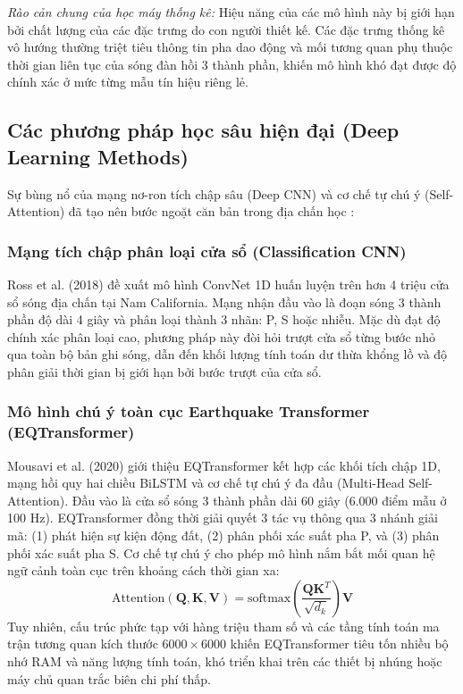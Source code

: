 \documentclass[preprint,1p]{elsarticle}
\begin{document}
\textit{Rào cản chung của học máy thống kê:} Hiệu năng của các mô hình này bị giới hạn bởi chất lượng của các đặc trưng do con người thiết kế. Các đặc trưng thống kê vô hướng thường triệt tiêu thông tin pha dao động và mối tương quan phụ thuộc thời gian liên tục của sóng đàn hồi 3 thành phần, khiến mô hình khó đạt được độ chính xác ở mức từng mẫu tín hiệu riêng lẻ.

\subsection{Các phương pháp học sâu hiện đại (Deep Learning Methods)}
\label{sec:related_dl}

Sự bùng nổ của mạng nơ-ron tích chập sâu (Deep CNN) và cơ chế tự chú ý (Self-Attention) đã tạo nên bước ngoặt căn bản trong địa chấn học \cite{xie2023deep}:

\subsubsection{Mạng tích chập phân loại cửa sổ (Classification CNN)}
Ross et al. (2018) \cite{ross2018generalized} đề xuất mô hình ConvNet 1D huấn luyện trên hơn 4 triệu cửa sổ sóng địa chấn tại Nam California. Mạng nhận đầu vào là đoạn sóng 3 thành phần độ dài 4 giây và phân loại thành 3 nhãn: P, S hoặc nhiễu. Mặc dù đạt độ chính xác phân loại cao, phương pháp này đòi hỏi trượt cửa sổ từng bước nhỏ qua toàn bộ bản ghi sóng, dẫn đến khối lượng tính toán dư thừa khổng lồ và độ phân giải thời gian bị giới hạn bởi bước trượt của cửa sổ.

\subsubsection{Mô hình chú ý toàn cục Earthquake Transformer (EQTransformer)}
Mousavi et al. (2020) \cite{mousavi2020earthquake} giới thiệu EQTransformer kết hợp các khối tích chập 1D, mạng hồi quy hai chiều BiLSTM và cơ chế tự chú ý đa đầu (Multi-Head Self-Attention). Đầu vào là cửa sổ sóng 3 thành phần dài 60 giây (6.000 điểm mẫu ở 100 Hz). EQTransformer đồng thời giải quyết 3 tác vụ thông qua 3 nhánh giải mã: (1) phát hiện sự kiện động đất, (2) phân phối xác suất pha P, và (3) phân phối xác suất pha S. Cơ chế tự chú ý cho phép mô hình nắm bắt mối quan hệ ngữ cảnh toàn cục trên khoảng cách thời gian xa:
\begin{equation}
\text{Attention}(\mathbf{Q}, \mathbf{K}, \mathbf{V}) = \text{softmax}\left(\frac{\mathbf{Q}\mathbf{K}^T}{\sqrt{d_k}}\right)\mathbf{V}
\label{eq:attention}
\end{equation}
Tuy nhiên, cấu trúc phức tạp với hàng triệu tham số và các tầng tính toán ma trận tương quan kích thước $6000 \times 6000$ khiến EQTransformer tiêu tốn nhiều bộ nhớ RAM và năng lượng tính toán, khó triển khai trên các thiết bị nhúng hoặc máy chủ quan trắc biên chi phí thấp.
\end{document}
